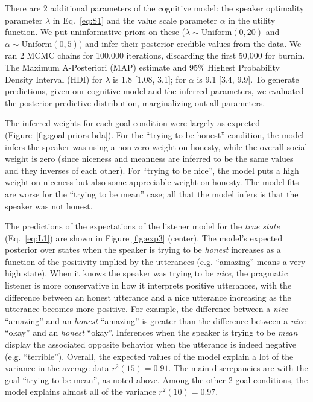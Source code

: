 \documentclass[10pt,letterpaper]{article}
\newcommand{\red}[1]{\textcolor{Red}{#1}}
\begin{document}
There are 2 additional parameters of the cognitive model: the speaker optimality parameter $\lambda$ in Eq.~\ref{eq:S1} and the value scale parameter $\alpha$ in the utility function.
We put uninformative priors on these ($\lambda \sim \text{Uniform}(0,20)$ and $\alpha \sim \text{Uniform}(0, 5)$) and infer their posterior credible values from the data.
We ran 2 MCMC chains for 100,000 iterations, discarding the first 50,000 for burnin.
The Maximum A-Posteriori (MAP) estimate and 95\% Highest Probability Density Interval (HDI) for $\lambda$ is 1.8 [1.08, 3.1]; for $\alpha$ is 9.1 [3.4, 9.9]. %
To generate predictions, given our cognitive model and the inferred parameters, we evaluated the posterior predictive distribution, marginalizing out all parameters.

The inferred weights for each goal condition were largely as expected (Figure~\ref{fig:goal-priors-bda}).
For the ``trying to be honest'' condition, the model infers the speaker was using a non-zero weight on honesty, while the overall social weight is zero (since niceness and meanness are inferred to be the same values and they inverses of each other).
For ``trying to be nice'', the model puts a high weight on niceness but also some appreciable weight on honesty.
The model fits are worse for the ``trying to be mean'' case; all that the model infers is that the speaker was not honest.

The predictions of the expectations of the listener model for the \emph{true state} (Eq.~\ref{eq:L1}) are shown in Figure \ref{fig:exp3} (center).
The model's expected posterior over states when the speaker is trying to be \emph{honest} increases as a function of the positivity implied by the utterances (e.g. ``amazing'' means a very high state).
When it knows the speaker was trying to be \emph{nice}, the pragmatic listener is more conservative in how it interprets positive utterances, with the difference between an honest utterance and a nice utterance increasing as the utterance becomes more positive. 
For example, the difference between a \emph{nice} ``amazing'' and an \emph{honest} ``amazing'' is greater than the difference between a \emph{nice} ``okay'' and an \emph{honest} ``okay''.
Inferences when the speaker is trying to be \emph{mean} display the associated opposite behavior when the utterance is indeed negative (e.g. ``terrible'').
Overall, the expected values of the model explain a lot of the variance in the average data $r^2(15) = 0.91$.
The main discrepancies are with the goal ``trying to be mean'', as noted above.
Among the other 2 goal conditions, the model explains almost all of the variance $r^2(10) = 0.97$.
\end{document}
